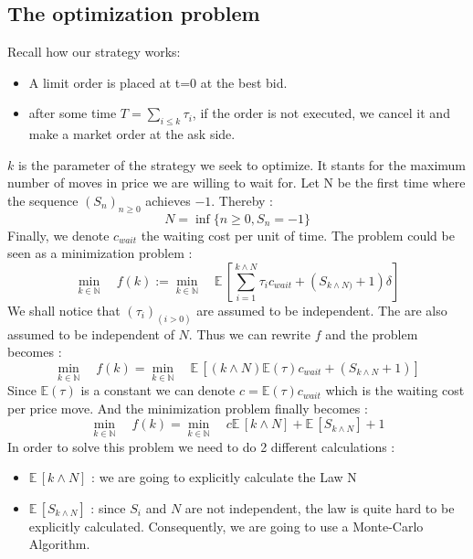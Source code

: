 \documentclass{article}
\newcommand{\Min}[2]{ {#1} \wedge {#2} }
\begin{document}
\subsection{The optimization problem}
Recall how our strategy works:
\begin{itemize}
	\item A limit order is placed at t=0 at the best bid.
	\item after some time $T = \sum_{i \leq k} \tau_i$, if the order is not executed, we cancel it and make a market order at the ask side.
\end{itemize}
$k$ is the parameter of the strategy we seek to optimize. It stants for the maximum number of moves in price we are willing to wait for. 
Let N be the first time where the sequence $(S_{n})_{n\geq0}$  achieves $-1$. Thereby :
$$ N= \inf \{ n\geq0 , S_{n}=-1   \} $$
Finally, we denote $c_{wait}$ the waiting cost per unit of time.
The problem could be seen as a minimization problem  :
\begin{equation}
 \min\limits_{k \in \mathbb{N}} \quad f(k) := \min\limits_{k \in \mathbb{N}} \quad \mathbb{E}\,\left[ \sum_{i=1}^{\Min k N}\tau_i c_{wait} + (S_{\Min k N)}+1)\delta\right]
\end{equation}
We shall notice that $(\tau_i)_{(i>0)}$ are assumed to be independent. The are also assumed to be independent of $N$.
Thus we can rewrite $f$ and the problem becomes : 
\begin{equation}
 \min\limits_{k \in \mathbb{N}} \quad f(k)= \min\limits_{k \in \mathbb{N}} \quad \mathbb{E}\,\left[ ({\Min k N})  \mathbb{E}(\tau) c_{wait} + (S_{\Min k N}+1) \right]
\end{equation}
Since $\mathbb{E}(\tau)$ is a constant we can denote
$c = \mathbb{E}(\tau) c_{wait}$ which is the waiting cost per price move. And the minimization problem finally becomes :
\begin{equation}
 \min\limits_{k \in \mathbb{N}} \quad f(k)= \min\limits_{k \in \mathbb{N}} \quad c \mathbb{E}\,\left[ {\Min k N}\right]   +  \mathbb{E}\,\left[S_{\Min k N}\right] +1
\end{equation}
In order to solve this problem we need to do 2 different calculations :
\begin{itemize}
\item $\mathbb{E}\,\left[ {\Min k N}\right]$ : we are going to explicitly calculate the Law N
\item $\mathbb{E}\,\left[S_{\Min k N}\right]$ : since $S_i$ and $N$ are not independent, the law is quite hard to be explicitly calculated. Consequently, we are going to use a Monte-Carlo Algorithm.
\end{itemize}
\end{document}
